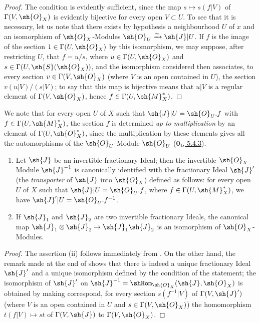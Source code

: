 \begin{proof}
The condition is evidently sufficient, since the map $s\mapsto s(f|V)$ of $\Gamma(V,\sh{O}_X)$ is evidently bijective for every open $V\subset U$.
To see that it is necessary, let us note that there exists by hypothesis a neighbourhood $U$ of $x$ and an isomorphism of $\sh{O}_X$-Modules $\sh{O}_U\xrightarrow{\sim}\sh{J}|U$.
If $f$ is the image of the section $1\in\Gamma(U,\sh{O}_X)$ by this isomorphism, we may suppose, after restricting $U$, that $f=u/s$, where $u\in\Gamma(U,\sh{O}_X)$ and $s\in\Gamma(U,\sh{S}(\sh{O}_X))$, and the isomorphism considered then associates, to every section $v\in\Gamma(V,\sh{O}_X)$ (where $V$ is an open contained in $U$), the section $v(u|V)/(s|V)$;
to say that this map is bijective means that $u|V$ is a regular element of $\Gamma(V,\sh{O}_X)$, hence $f\in\Gamma(U,\sh{M}_X^*)$.
\end{proof}


We note that for every open $U$ of $X$ such that $\sh{J}|U=\sh{O}_U.f$ with $f\in\Gamma(U,\sh{M}_X^*)$, the section $f$ is determined \emph{up to multiplication} by an element of $\Gamma(U,\sh{O}_X^*)$, since the
multiplication by these elements gives all the automorphisms of the $\sh{O}_U$-Module $\sh{O}_U$ (\hyperref[0.5.4.3]{$\mathbf{0_I}$, 5.4.3}).

\begin{corollary}[21.2.3]
\label{IV.21.2.3}
\begin{enumerate}[label=(\roman*)]
  \item Let $\sh{J}$ be an invertible fractionary Ideal;
  then the invertible $\sh{O}_X$-Module $\sh{J}^{-1}$ is canonically identified with the fractionary Ideal $\sh{J}'$ (the \emph{transporter} of $\sh{J}$ into $\sh{O}_X$) defined as follows:
  for every open $U$ of $X$ such that $\sh{J}|U=\sh{O}_U.f$, where $f\in\Gamma(U,\sh{M}_X^*)$, we have $\sh{J}'|U=\sh{O}_U.f^{-1}$.
  \item If $\sh{J}_1$ and $\sh{J}_2$ are two invertible fractionary Ideals, the canonical map $\sh{J}_1\otimes\sh{J}_2\to\sh{J}_1\sh{J}_2$ is an isomorphism of $\sh{O}_X$-Modules.
\end{enumerate}
\end{corollary}

\begin{proof}
The assertion (ii) follows immediately from .
On the other hand, the remark made at the end of  shows that there is indeed a unique fractionary Ideal $\sh{J}'$ and a unique isomorphism defined by the condition of the statement;
the isomorphism of $\sh{J}'$ on $\sh{J}^{-1}=\shHom_{\sh{O}_X}(\sh{J},\sh{O}_X)$ is obtained by making correspond, for every section $s(f^{-1}|V)$ of $\Gamma(V,\sh{J}')$ (where $V$ is an open contained in $U$ and $s\in\Gamma(V,\sh{O}_X)$) the homomorphism $t(f|V)\mapsto st$ of $\Gamma(V,\sh{J})$ to $\Gamma(V,\sh{O}_X)$.
\end{proof}

